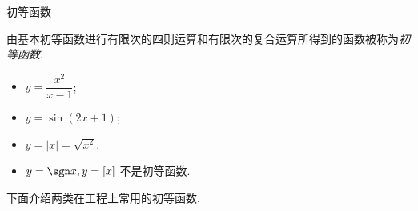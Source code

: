 \begin{frame}{初等函数}
	\onslide<+->
	\begin{definition}
		由基本初等函数进行有限次的四则运算和有限次的复合运算所得到的函数被称为\emph{初等函数}.
	\end{definition}
	\onslide<+->
	\begin{example}
		\begin{itemize}
			\item $y=\dfrac{x^2}{x-1}$;
			\item $y=\sin(2x+1)$;
			\item $y=|x|=\sqrt{x^2}$.
			\item $y=\sgn x, y=[x]$ 不是初等函数.
		\end{itemize}
	\end{example}
	\onslide<+->
	下面介绍两类在工程上常用的初等函数.
\end{frame}


